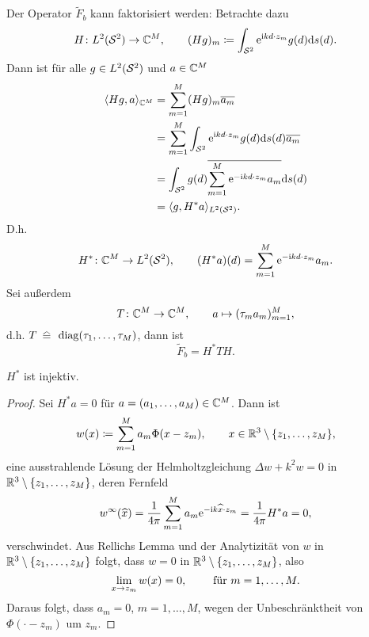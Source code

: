 Der Operator \(\widetilde{F}_b\) kann faktorisiert werden: Betrachte dazu
\begin{equation}
	\label{H operator zur faktorisierung von tilde(F)_b}
	H\colon L^2(\mathcal{S}^2) \to \mathbb{C}^M,\qquad(Hg)_m\coloneqq\int_{\mathcal{S}^2}\mathrm{e}^{\mathrm{i} kd\cdot z_m}g(d)\mathrm{d}s(d).
\end{equation}
Dann ist für alle \(g\in L^2(\mathcal{S}^2)\) und \(a\in\mathbb{C}^M\)
\begin{align*}
	\langle Hg,a\rangle_{\mathbb{C}^M}
	&=\sum_{m=1}^M(Hg)_m\overline{a_m}\\
	&=\sum_{m=1}^M\int_{\mathcal{S}^2}\mathrm{e}^{\mathrm{i} kd\cdot z_m}g(d)\mathrm{d}s(d)\overline{a_m}\\
	&=\int_{\mathcal{S}^2}g(d)\overline{\sum_{m=1}^M\mathrm{e}^{-\mathrm{i} kd\cdot z_m}a_m}\mathrm{d}s(d)\\
	&=\langle g, H^\ast a\rangle_{L^2(\mathcal{S}^2)}.
\end{align*}
D.h.
\begin{equation}
	\label{adjungierter H operator zur faktorisierung von tilde(F)_b}
	H^\ast\colon\mathbb{C}^M \to L^2(\mathcal{S}^2),\qquad(H^\ast a)(d)=\sum_{m=1}^M\mathrm{e}^{-\mathrm{i} kd\cdot z_m}a_m.
\end{equation}
Sei außerdem
\begin{equation*}
	T\colon\mathbb{C}^M \to \mathbb{C}^M,\qquad a\mapsto(\tau_ma_m)_{m=1}^M,
\end{equation*}
d.h. \(T\equalhat\diag(\tau_1,\ldots,\tau_M)\), dann ist
\begin{equation}
	\label{zerlegung von tilde(F)_b}
	\widetilde{F}_b=H^\ast TH.
\end{equation}
\begin{lem}\label{lem: adjungierter H operator injektiv}
	\(H^\ast\) ist injektiv.
\end{lem}
\begin{proof}
	Sei \(H^\ast a=0\) für \(a=(a_1,\ldots,a_M)\in\mathbb{C}^M\). Dann ist
	\begin{equation*}
		w(x)\coloneqq\sum_{m=1}^Ma_m\Phi(x-z_m),\qquad x\in\mathbb{R}^3\setminus\{z_1,\ldots,z_M\},
	\end{equation*}
	eine ausstrahlende Lösung der Helmholtzgleichung \(\Delta w+k^2w=0\) in \(\mathbb{R}^3\setminus\{z_1,\ldots,z_M\}\), deren Fernfeld
	\begin{equation*}
		w^\infty(\widehat{x})=\frac{1}{4\pi}\sum_{m=1}^Ma_m\mathrm{e}^{-\mathrm{i} k\widehat{x}\cdot z_m}=\frac{1}{4\pi}H^\ast a=0,
	\end{equation*}
	verschwindet. Aus Rellichs Lemma und der Analytizität von \(w\) in \(\mathbb{R}^3\setminus\{z_1,\ldots,z_M\}\) folgt, dass \(w=0\) in \(\mathbb{R}^3\setminus\{z_1,\ldots,z_M\}\), also 
	\begin{equation*}
		\lim_{x\to z_m}w(x)=0,\qquad\text{ für }m=1,\ldots,M.
	\end{equation*}
	Daraus folgt, dass \(a_m=0\), \(m=1,\ldots,M\), wegen der Unbeschränktheit von \(\Phi(\cdot-z_m)\) um \(z_m\).
\end{proof}
